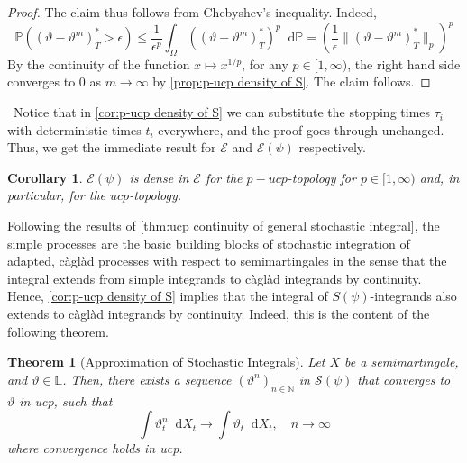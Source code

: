 \documentclass[11pt,a4paper,twoside,openany]{report}
\newcommand{\diff}{\mathop{}\!\mathrm{d}}
\theoremstyle{plain} %
\newtheorem{theorem}{Theorem}[chapter]
\newtheorem{corollary}[corollary]{Corollary}
\theoremstyle{definition} %
\theoremstyle{remark} %
\begin{document}
\begin{proof}
   The claim thus follows from Chebyshev's inequality. Indeed,
    \begin{equation}
        \mathbb{P}((\vartheta-\vartheta^m)_{T}^*>\epsilon)\leq\frac{1}{\epsilon^p}\int_{\Omega}\left((\vartheta-\vartheta^m)_{T}^*\right)^p\diff \mathbb{P}=\left(\frac{1}{\epsilon}\lVert (\vartheta-\vartheta^m)_{T}^*\rVert_p\right)^p
    \end{equation}
By the continuity of the function \(x\mapsto x^{1/p}\), for any \(p\in[1,\infty)\), the right hand side converges to \(0\) as \(m\to\infty\) by \cref{prop:p-ucp density of S}. The claim follows. 
\end{proof}
\
Notice that in \cref{cor:p-ucp density of S} we can substitute the stopping times \(\tau_i\) with deterministic times \(t_i\) everywhere, and the proof goes through unchanged. Thus, we get the immediate result for \(\mathcal{E}\) and \(\mathcal{E}(\psi)\) respectively.
\begin{corollary}\label{cor:ucp and p-ucp density of E}
    \(\mathcal{E}(\psi)\) is dense in \(\mathcal{E}\) for the \(p-ucp\)-topology for \(p\in[1,\infty)\) and, in particular, for the \(ucp\)-topology.
\end{corollary}
Following the results of \cref{thm:ucp continuity of general stochastic integral}, the simple processes are the basic building blocks of stochastic integration of adapted, càglàd processes with respect to semimartingales in the sense that the integral extends from simple integrands to càglàd integrands by continuity. Hence, \cref{cor:p-ucp density of S} implies that the integral of \(S(\psi)\)-integrands also extends to càglàd integrands by continuity. Indeed, this is the content of the following theorem.
\begin{theorem}[Approximation of Stochastic Integrals]\label{thm:Approx of stoch. Integrals}
    Let \(X\) be a semimartingale, and \(\vartheta\in \mathbb{L}\). Then, there exists a sequence \((\vartheta^n)_{n\in\mathbb{N}}\) in \(\mathcal{S}(\psi)\) that converges to \(\vartheta\) in ucp, such that
    \begin{equation}
        \int \vartheta_t^n\diff X_t \to \int \vartheta_t\diff X_t,\quad n\to\infty
    \end{equation}
    where convergence holds in ucp.
\end{theorem}
\end{document}
